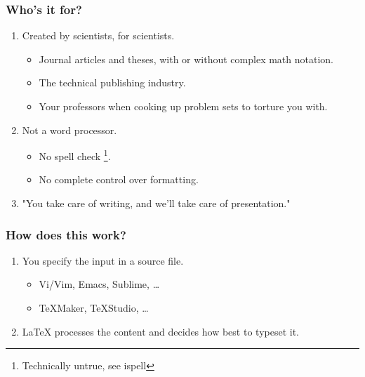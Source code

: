 \documentclass{beamer}
\begin{document}
\begin{frame}
\frametitle{Who's it for?}

\begin{enumerate}

    \item<1-> Created by scientists, for scientists.

        \begin{itemize}
            \item Journal articles and theses, with or without complex math
                notation.
            \item The technical publishing industry.
            \item Your professors when cooking up problem sets to torture you
                with.
        \end{itemize}

    \item<2-> Not a word processor.

        \begin{itemize}
            \item No spell check \footnote{Technically untrue, see ispell}.
            \item No complete control over formatting.
        \end{itemize}
    \item<3-> "You take care of writing, and we'll take care of presentation."

\end{enumerate}

\end{frame}

\begin{frame}
\frametitle{How does this work?}

\begin{enumerate}

    \item You specify the input in a source file.

        \begin{itemize}
            \item Vi/Vim, Emacs, Sublime, \dots
            \item TeXMaker, TeXStudio, \dots
        \end{itemize}

    \item LaTeX processes the content and decides how best to typeset it.

\end{enumerate}

\vspace{0.5cm}


\vspace{0.5cm}


\end{frame}
 
\end{document}
